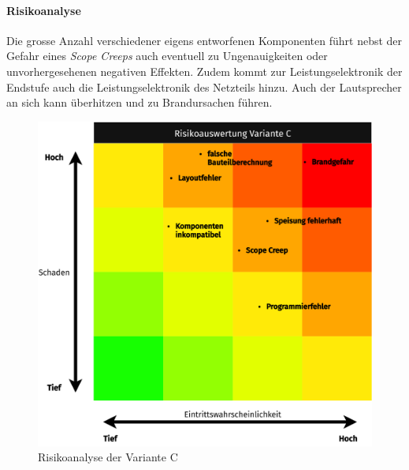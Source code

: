 \paragraph{Risikoanalyse}
Die grosse Anzahl verschiedener eigens entworfenen Komponenten führt nebst der Gefahr eines \textit{Scope Creeps} auch eventuell zu Ungenauigkeiten oder unvorhergesehenen negativen Effekten. Zudem kommt zur Leistungselektronik der Endstufe auch die Leistungselektronik des Netzteils hinzu. Auch der Lautsprecher an sich kann überhitzen und zu Brandursachen führen.
\begin{figure}[H]
	\vspace{1cm}
	\centering
	\includegraphics[width=\textwidth*4/5]{pictures/risks-Variante C.png}
	\caption{Risikoanalyse der Variante C}
\end{figure}
\newpage
